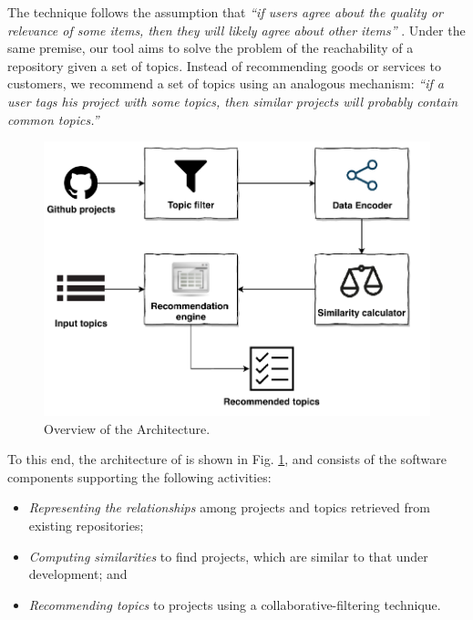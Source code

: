 The technique follows the assumption that \emph{``if users agree about the quality or relevance of some items, then they will likely agree about other items''} \cite{Schafer:2007:CFR:1768197.1768208}. Under the same premise, our tool aims to solve the problem of the reachability of a \GH repository given a set of topics. Instead of recommending goods or services to customers, we recommend a set of topics using an analogous mechanism: \emph{``if a user tags his project with some topics, then similar projects will probably contain common topics.''} 

\begin{figure}[t!]
	\centering
	\includegraphics[width=\linewidth]{figs/CFTop.pdf}
	\caption{Overview of the \CT Architecture.}%
	\label{fig:CrossRecArchitecture}
\end{figure}

%
To this end, the architecture of \CT is shown in Fig. \ref{fig:CrossRecArchitecture}, and consists of the software components supporting the following activities:

\begin{itemize}
\item \textit{Representing the relationships} among projects and topics retrieved from existing repositories;
\item \textit{Computing similarities} to find projects, which are similar to that under development; and
\item \textit{Recommending topics} to projects using a collaborative-filtering technique.
\end{itemize}


